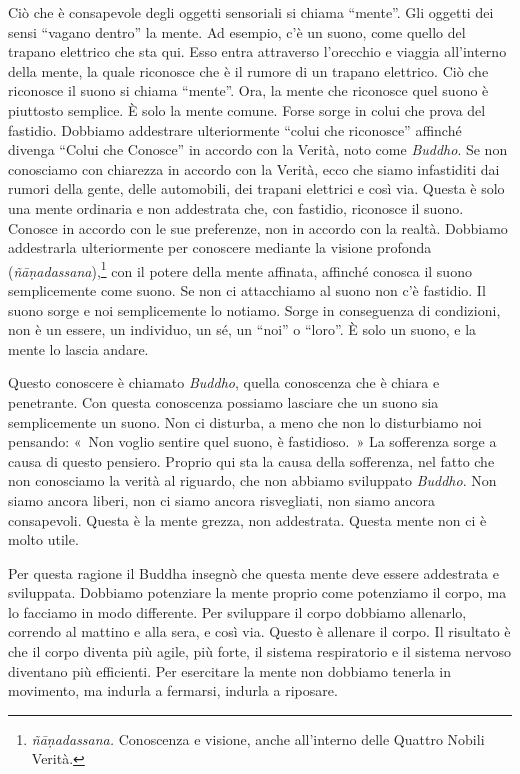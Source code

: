Ciò che è consapevole degli oggetti sensoriali si chiama ``mente''. Gli
oggetti dei sensi ``vagano dentro'' la mente. Ad esempio, c'è un suono,
come quello del trapano elettrico che sta qui. Esso entra attraverso
l'orecchio e viaggia all'interno della mente, la quale riconosce che è
il rumore di un trapano elettrico. Ciò che riconosce il suono si chiama
``mente''. Ora, la mente che riconosce quel suono è piuttosto semplice.
È solo la mente comune. Forse sorge in colui che prova del fastidio.
Dobbiamo addestrare ulteriormente ``colui che riconosce'' affinché
divenga ``Colui che Conosce'' in accordo con la Verità, noto come
\emph{Buddho}. Se non conosciamo con chiarezza in accordo con la Verità,
ecco che siamo infastiditi dai rumori della gente, delle automobili, dei
trapani elettrici e così via. Questa è solo una mente ordinaria e non
addestrata che, con fastidio, riconosce il suono. Conosce in accordo con
le sue preferenze, non in accordo con la realtà. Dobbiamo addestrarla
ulteriormente per conoscere mediante la visione profonda
(\emph{ñāṇadassana}),\footnote{\emph{ñāṇadassana.} Conoscenza e visione,
  anche all'interno delle Quattro Nobili Verità.} con il potere della
mente affinata, affinché conosca il suono semplicemente come suono. Se
non ci attacchiamo al suono non c'è fastidio. Il suono sorge e noi
semplicemente lo notiamo. Sorge in conseguenza di condizioni, non è un
essere, un individuo, un sé, un ``noi'' o ``loro''. È solo un suono, e
la mente lo lascia andare.

Questo conoscere è chiamato \emph{Buddho}, quella conoscenza che è
chiara e penetrante. Con questa conoscenza possiamo lasciare che un
suono sia semplicemente un suono. Non ci disturba, a meno che non lo
disturbiamo noi pensando: «~Non voglio sentire quel suono, è
fastidioso.~» La sofferenza sorge a causa di questo pensiero. Proprio
qui sta la causa della sofferenza, nel fatto che non conosciamo la
verità al riguardo, che non abbiamo sviluppato \emph{Buddho}. Non siamo
ancora liberi, non ci siamo ancora risvegliati, non siamo ancora
consapevoli. Questa è la mente grezza, non addestrata. Questa mente non
ci è molto utile.

Per questa ragione il Buddha insegnò che questa mente deve essere
addestrata e sviluppata. Dobbiamo potenziare la mente proprio come
potenziamo il corpo, ma lo facciamo in modo differente. Per sviluppare
il corpo dobbiamo allenarlo, correndo al mattino e alla sera, e così
via. Questo è allenare il corpo. Il risultato è che il corpo diventa più
agile, più forte, il sistema respiratorio e il sistema nervoso diventano
più efficienti. Per esercitare la mente non dobbiamo tenerla in
movimento, ma indurla a fermarsi, indurla a riposare.

